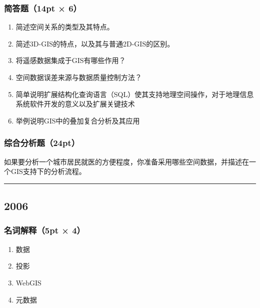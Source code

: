 \documentclass[]{article}
\begin{document}
\hypertarget{header-n277}{%
\subsubsection{简答题（14pt × 6）}\label{header-n277}}

\begin{enumerate}
\def\labelenumi{\arabic{enumi}.}
\item
  简述空间关系的类型及其特点。
\item
  简述3D-GIS的特点，以及其与普通2D-GIS的区别。
\item
  将遥感数据集成于GIS有哪些作用？
\item
  空间数据误差来源与数据质量控制方法？
\item
  简单说明扩展结构化查询语言（SQL）使其支持地理空间操作，对于地理信息系统软件开发的意义以及扩展关键技术
\item
  举例说明GIS中的叠加复合分析及其应用
\end{enumerate}

\hypertarget{header-n291}{%
\subsubsection{综合分析题（24pt）}\label{header-n291}}

如果要分析一个城市居民就医的方便程度，你准备采用哪些空间数据，并描述在一个GIS支持下的分析流程。

\begin{center}\rule{0.5\linewidth}{\linethickness}\end{center}

\hypertarget{header-n294}{%
\subsection{2006}\label{header-n294}}

\hypertarget{header-n295}{%
\subsubsection{名词解释（5pt × 4）}\label{header-n295}}

\begin{enumerate}
\def\labelenumi{\arabic{enumi}.}
\item
  数据
\item
  投影
\item
  WebGIS
\item
  元数据
\end{enumerate}
\end{document}
